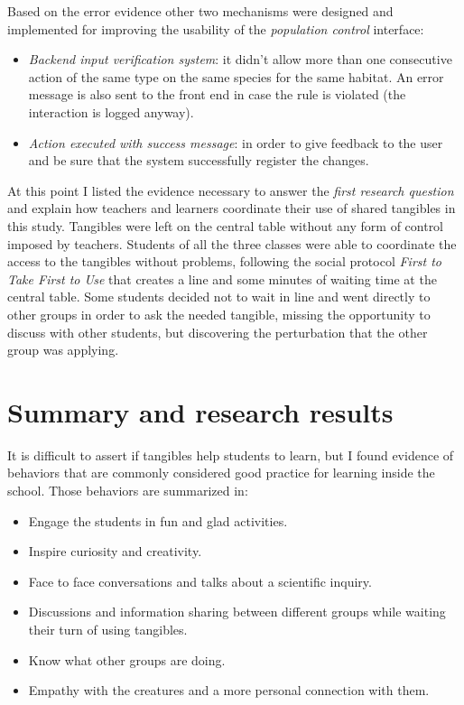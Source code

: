 Based on the error evidence other two mechanisms were designed and implemented for improving the usability of the \textit{population control} interface:
\begin{itemize}
\item \textit{Backend input verification system}: it didn't allow more than one consecutive action of the same type on the same species for the same habitat. An error message is also sent to the front end in case the rule is violated (the interaction is logged anyway).
\item \textit{Action executed with success message}: in order to give feedback \cite{norman:design} to the user and be sure that the system successfully register the changes.
\end{itemize}

At this point I listed the evidence necessary to answer the \textit{first research question} and explain how teachers and learners coordinate their use of shared tangibles in this study. Tangibles were left on the central table without any form of control imposed by teachers. Students of all the three classes were able to coordinate the access to the tangibles without problems, following the social protocol \textit{First to Take First to Use} that creates a line and some minutes of waiting time at the central table. Some students decided not to wait in line and went directly to other groups in order to ask the needed tangible, missing the opportunity to discuss with other students, but discovering the perturbation that the other group was applying.

\section{Summary and research results}

It is difficult to assert if tangibles help students to learn, but I found evidence of behaviors that are commonly considered good practice for learning inside the school. Those behaviors are summarized in:
\begin{itemize}
\item Engage the students in fun and glad activities.
\item Inspire curiosity and creativity.
\item Face to face conversations and talks about a scientific inquiry.
\item Discussions and information sharing between different groups while waiting their turn of using tangibles.
\item Know what other groups are doing.
\item Empathy with the creatures and a more personal connection with them.
\end{itemize}

